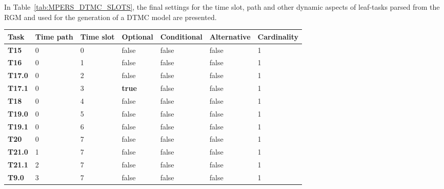 In Table~\ref{tab:MPERS_DTMC_SLOTS}, the final settings for the time slot, path and other dynamic aspects of leaf-tasks parsed from the RGM and used for the generation of a DTMC model are presented.

\begin{table}
{\renewcommand{\arraystretch}{1.5}
\begin{tabularx}{\textwidth}{@{}lllllll@{}}
\toprule
\textbf{Task}  & \textbf{Time path} & \textbf{Time slot} & \textbf{Optional} & \textbf{Conditional} & \textbf{Alternative} & \textbf{Cardinality} \\ \midrule
\textbf{T15}   & 0                  & 0                  & false             & false                & false                & 1           \\
\textbf{T16}   & 0                  & 1                  & false             & false                & false                & 1           \\
\textbf{T17.0} & 0                  & 2                  & false             & false                & false                & 1           \\
\textbf{T17.1} & 0                  & 3                  & \textbf{true}    & false                 & false                & 1           \\
\textbf{T18}   & 0                  & 4                  & false             & false                & false                & 1           \\
\textbf{T19.0} & 0                  & 5                  & false             & false                & false                & 1           \\
\textbf{T19.1} & 0                  & 6                  & false             & false                & false                & 1           \\
\textbf{T20}   & 0                  & 7                  & false             & false                & false                & 1           \\
\textbf{T21.0}   & 1                & 7                  & false             & false                & false                & 1           \\
\textbf{T21.1}   & 2                & 7                  & false             & false                & false                & 1           \\
\textbf{T9.0}  & 3                  & 7                  & false             & false	        		& false                 & 1           \\

\end{tabularx}}
\end{table}
